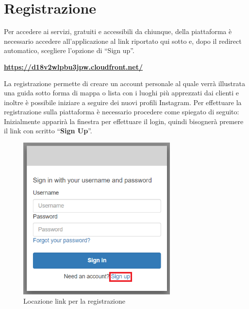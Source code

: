 \section{Registrazione} {

Per accedere ai servizi, gratuiti e accessibili da chiunque, della piattaforma \platform{} è necessario accedere all'applicazione al link riportato qui sotto e, dopo il redirect automatico, scegliere l'opzione di ``Sign up''.

\begin{center}
    \href{https://d18v2wlpbu3jpw.cloudfront.net}\textbf{{https://d18v2wlpbu3jpw.cloudfront.net/}}
\end{center}

La registrazione permette di creare un account personale al quale verrà illustrata una guida sotto forma di mappa o lista con i luoghi più apprezzati dai clienti e 
inoltre è possibile iniziare a seguire dei nuovi profili Instagram. \aCapo
Per effettuare la registrazione sulla piattaforma \platform{} è necessario procedere come spiegato di seguito: \aCapo 
Inizialmente apparirà la finestra per effettuare il login, quindi bisognerà premere il link con scritto ``\textbf{Sign Up}''.
\begin{figure}[H]
    \includegraphics[width=8cm]{sezioni/images/tasto-reg.png}
    \centering
    \caption{Locazione link per la registrazione}
\end{figure}

}
